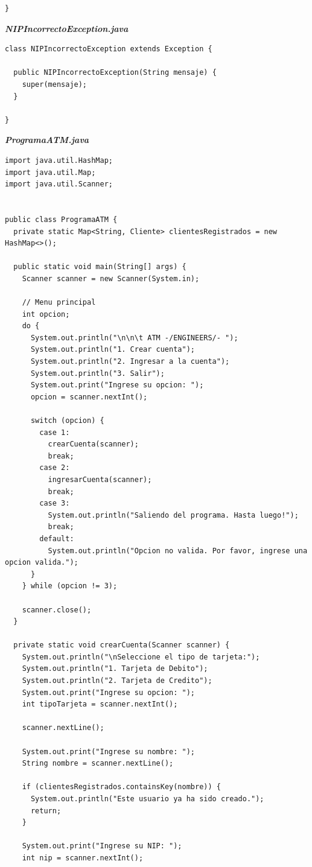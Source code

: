\documentclass[12pt]{article}
\begin{document}
\begin{enumerate}
\begin{lstlisting}
}
    \end{lstlisting}

    \textbf{\textit{NIPIncorrectoException.java}}
    \begin{lstlisting}
class NIPIncorrectoException extends Exception {

  public NIPIncorrectoException(String mensaje) {
    super(mensaje);
  }
    
}
    \end{lstlisting}

    \textbf{\textit{ProgramaATM.java}}
    \begin{lstlisting}
import java.util.HashMap;
import java.util.Map;
import java.util.Scanner;


public class ProgramaATM {
  private static Map<String, Cliente> clientesRegistrados = new HashMap<>();

  public static void main(String[] args) {
    Scanner scanner = new Scanner(System.in);

    // Menu principal
    int opcion;
    do {
      System.out.println("\n\n\t ATM -/ENGINEERS/- ");
      System.out.println("1. Crear cuenta");
      System.out.println("2. Ingresar a la cuenta");
      System.out.println("3. Salir");
      System.out.print("Ingrese su opcion: ");
      opcion = scanner.nextInt();

      switch (opcion) {
        case 1:
          crearCuenta(scanner);
          break;
        case 2:
          ingresarCuenta(scanner);
          break;
        case 3:
          System.out.println("Saliendo del programa. Hasta luego!");
          break;
        default:
          System.out.println("Opcion no valida. Por favor, ingrese una opcion valida.");
      }
    } while (opcion != 3);

    scanner.close();
  }

  private static void crearCuenta(Scanner scanner) {
    System.out.println("\nSeleccione el tipo de tarjeta:");
    System.out.println("1. Tarjeta de Debito");
    System.out.println("2. Tarjeta de Credito");
    System.out.print("Ingrese su opcion: ");
    int tipoTarjeta = scanner.nextInt();

    scanner.nextLine(); 

    System.out.print("Ingrese su nombre: ");
    String nombre = scanner.nextLine();

    if (clientesRegistrados.containsKey(nombre)) {
      System.out.println("Este usuario ya ha sido creado.");
      return;
    }

    System.out.print("Ingrese su NIP: ");
    int nip = scanner.nextInt();


\end{lstlisting}
\end{enumerate}
\end{document}
